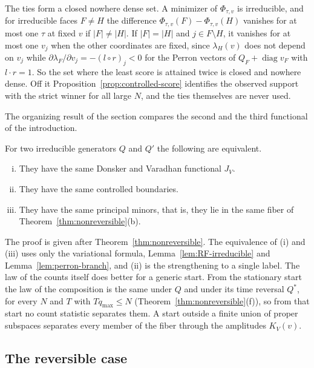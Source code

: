 The ties form a closed nowhere dense set. A minimizer of $\Phi_{\tau,v}$ is irreducible, and for
irreducible faces $F\ne H$ the difference $\Phi_{\tau,v}(F)-\Phi_{\tau,v}(H)$
vanishes for at most one $\tau$ at fixed $v$ if $|F|\ne|H|$. If $|F|=|H|$ and
$j\in F\setminus H$, it vanishes for at most one $v_j$ when the other
coordinates are fixed, since $\lambda_H(v)$ does not depend on $v_j$ while
$\partial\lambda_F/\partial v_j=-(l\circ r)_j<0$ for the Perron vectors of
$Q_F+\operatorname{diag}v_F$ with $l\cdot r=1$. So the set where the least score
is attained twice is closed and nowhere dense. Off it
Proposition~\ref{prop:controlled-score} identifies the observed support with the
strict winner for all large $N$, and the ties themselves are never used.

The organizing result of the section compares the second and the third
functional of the introduction.

\begin{corollary}\label{cor:dv-fiber}
For two irreducible generators $Q$ and $Q'$ the following are equivalent.
\begin{enumerate}[(i)]
\item They have the same Donsker and Varadhan functional $J_V$.
\item They have the same controlled boundaries.
\item They have the same principal minors, that is, they lie in the same fiber
of Theorem~\ref{thm:nonreversible}(b).
\end{enumerate}
\end{corollary}

The proof is given after Theorem~\ref{thm:nonreversible}. The equivalence of
(i) and (iii) uses only the variational formula, Lemma~\ref{lem:RF-irreducible}
and Lemma~\ref{lem:perron-branch}, and (ii) is the strengthening to a single
label. The law of the counts itself does better for a generic start. From the
stationary start the law of the composition is the same under $Q$ and under its
time reversal $Q^*$, for every $N$ and $T$ with $Tq_{\max}\le N$
(Theorem~\ref{thm:nonreversible}(f)), so from that start no count statistic
separates them. A start outside a finite union of proper subspaces separates
every member of the fiber through the amplitudes $K_V(v)$.

\subsection{The reversible case}\label{sec:reversible-reconstruction}

